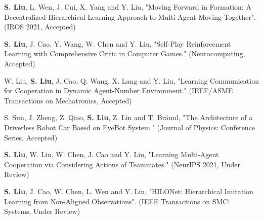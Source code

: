 \begin{itemize}[leftmargin=*]
  {\small

  \item
  \textbf{S. Liu}, L. Wen, J. Cui, X. Yang and Y. Liu, "Moving Forward in Formation: A Decentralized Hierarchical Learning Approach to Multi-Agent Moving Together". (IROS 2021, Accepted)
  \item
  \textbf{S. Liu}, J. Cao, Y. Wang, W. Chen and Y. Liu, "Self-Play Reinforcement Learning with Comprehensive Critic in Computer Games." (Neurocomputing, Accepted)
  \item
  W. Liu, \textbf{S. Liu}, J. Cao, Q. Wang, X. Lang and Y. Liu, "Learning Communication for Cooperation in Dynamic Agent-Number Environment." (IEEE/ASME Transactions on Mechatronics, Accepted)
  \item 
  S. Sun, J. Zheng, Z. Qiao, \textbf{S. Liu}, Z. Lin and T. Bräunl, "The Architecture of a Driverless Robot Car Based on EyeBot System." (Journal of Physics: Conference Series, Accepted)
  \item
  \textbf{S. Liu}, W. Liu, W. Chen, J. Cao and Y. Liu, "Learning Multi-Agent Cooperation via Considering Actions of Teammates." (NeurIPS 2021, Under Review)
  \item
  \textbf{S. Liu}, J. Cao, W. Chen, L. Wen and Y. Liu, "HILONet: Hierarchical Imitation Learning from Non-Aligned Observations". (IEEE Transactions on SMC: Systems, Under Review)}

\end{itemize}